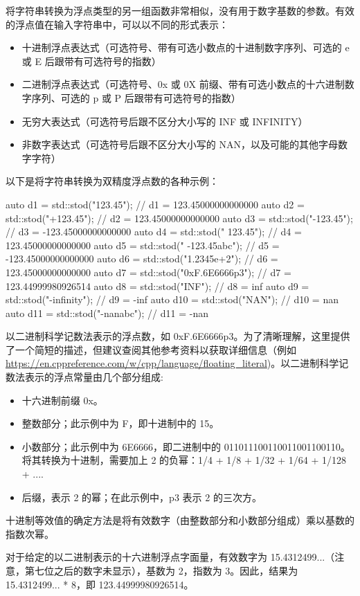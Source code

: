 将字符串转换为浮点类型的另一组函数非常相似，没有用于数字基数的参数。有效的浮点值在输入字符串中，可以以不同的形式表示：

\begin{itemize}
\item
十进制浮点表达式（可选符号、带有可选小数点的十进制数字序列、可选的 e 或 E 后跟带有可选符号的指数）

\item
二进制浮点表达式（可选符号、0x 或 0X 前缀、带有可选小数点的十六进制数字序列、可选的 p 或 P 后跟带有可选符号的指数）

\item
无穷大表达式（可选符号后跟不区分大小写的 INF 或 INFINITY）

\item
非数字表达式（可选符号后跟不区分大小写的 NAN，以及可能的其他字母数字字符）
\end{itemize}

以下是将字符串转换为双精度浮点数的各种示例：

\begin{cpp}
auto d1 = std::stod("123.45");         // d1 =  123.45000000000000
auto d2 = std::stod("+123.45");        // d2 =  123.45000000000000
auto d3 = std::stod("-123.45");        // d3 = -123.45000000000000
auto d4 = std::stod("  123.45");       // d4 =  123.45000000000000
auto d5 = std::stod("  -123.45abc");   // d5 = -123.45000000000000
auto d6 = std::stod("1.2345e+2");      // d6 =  123.45000000000000
auto d7 = std::stod("0xF.6E6666p3");   // d7 =  123.44999980926514
auto d8 = std::stod("INF");            // d8 = inf
auto d9 = std::stod("-infinity");      // d9 = -inf
auto d10 = std::stod("NAN");           // d10 = nan
auto d11 = std::stod("-nanabc");       // d11 = -nan
\end{cpp}

以二进制科学记数法表示的浮点数，如 0xF.6E6666p3。为了清晰理解，这里提供了一个简短的描述，但建议查阅其他参考资料以获取详细信息（例如 \url{https://en.cppreference.com/w/cpp/language/floating_literal})。以二进制科学记数法表示的浮点常量由几个部分组成:

\begin{itemize}
\item
十六进制前缀 0x。

\item
整数部分；此示例中为 F，即十进制中的 15。

\item
小数部分；此示例中为 6E6666，即二进制中的 011011100110011001100110。将其转换为十进制，需要加上 2 的负幂：1/4 + 1/8 + 1/32 + 1/64 + 1/128 + ....

\item
后缀，表示 2 的幂；在此示例中，p3 表示 2 的三次方。
\end{itemize}

十进制等效值的确定方法是将有效数字（由整数部分和小数部分组成）乘以基数的指数次幂。

对于给定的以二进制表示的十六进制浮点字面量，有效数字为 15.4312499...（注意，第七位之后的数字未显示），基数为 2，指数为 3。因此，结果为 15.4312499... * 8，即 123.44999980926514。


















